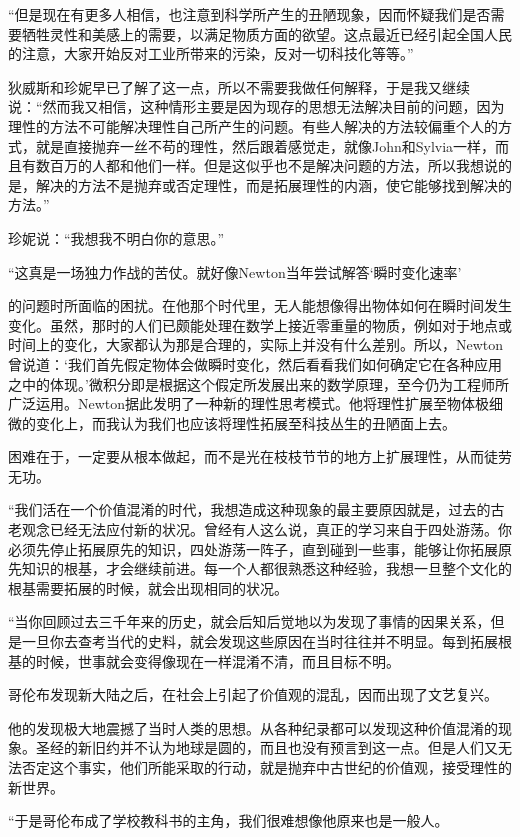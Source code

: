 \documentclass[UTF8]{article}
\begin{document}
\par “但是现在有更多人相信，也注意到科学所产生的丑陋现象，因而怀疑我们是否需要牺牲灵性和美感上的需要，以满足物质方面的欲望。这点最近已经引起全国人民的注意，大家开始反对工业所带来的污染，反对一切科技化等等。”
\par 狄威斯和珍妮早已了解了这一点，所以不需要我做任何解释，于是我又继续说：“然而我又相信，这种情形主要是因为现存的思想无法解决目前的问题，因为理性的方法不可能解决理性自己所产生的问题。有些人解决的方法较偏重个人的方式，就是直接抛弃一丝不苟的理性，然后跟着感觉走，就像John和Sylvia一样，而且有数百万的人都和他们一样。但是这似乎也不是解决问题的方法，所以我想说的是，解决的方法不是抛弃或否定理性，而是拓展理性的内涵，使它能够找到解决的方法。”
\par 珍妮说：“我想我不明白你的意思。”
\par “这真是一场独力作战的苦仗。就好像Newton当年尝试解答‘瞬时变化速率’
\par 的问题时所面临的困扰。在他那个时代里，无人能想像得出物体如何在瞬时间发生变化。虽然，那时的人们已颇能处理在数学上接近零重量的物质，例如对于地点或时间上的变化，大家都认为那是合理的，实际上并没有什么差别。所以，Newton曾说道：‘我们首先假定物体会做瞬时变化，然后看看我们如何确定它在各种应用之中的体现。’微积分即是根据这个假定所发展出来的数学原理，至今仍为工程师所广泛运用。Newton据此发明了一种新的理性思考模式。他将理性扩展至物体极细微的变化上，而我认为我们也应该将理性拓展至科技丛生的丑陋面上去。
\par 困难在于，一定要从根本做起，而不是光在枝枝节节的地方上扩展理性，从而徒劳无功。
\par “我们活在一个价值混淆的时代，我想造成这种现象的最主要原因就是，过去的古老观念已经无法应付新的状况。曾经有人这么说，真正的学习来自于四处游荡。你必须先停止拓展原先的知识，四处游荡一阵子，直到碰到一些事，能够让你拓展原先知识的根基，才会继续前进。每一个人都很熟悉这种经验，我想一旦整个文化的根基需要拓展的时候，就会出现相同的状况。
\par “当你回顾过去三千年来的历史，就会后知后觉地以为发现了事情的因果关系，但是一旦你去查考当代的史料，就会发现这些原因在当时往往并不明显。每到拓展根基的时候，世事就会变得像现在一样混淆不清，而且目标不明。
\par 哥伦布发现新大陆之后，在社会上引起了价值观的混乱，因而出现了文艺复兴。
\par 他的发现极大地震撼了当时人类的思想。从各种纪录都可以发现这种价值混淆的现象。圣经的新旧约并不认为地球是圆的，而且也没有预言到这一点。但是人们又无法否定这个事实，他们所能采取的行动，就是抛弃中古世纪的价值观，接受理性的新世界。
\par “于是哥伦布成了学校教科书的主角，我们很难想像他原来也是一般人。
\end{document}
